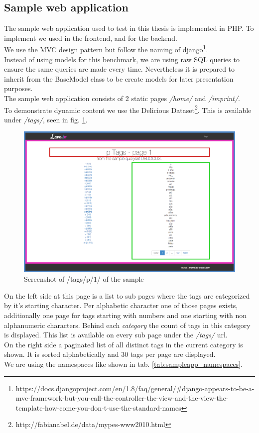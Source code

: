 \subsection{Sample web application}

The sample web application used to test \lare{} in this thesis is implemented in PHP.
To implement \lare{} we used \lareJS{} in the frontend, \twigLare{} and \phpLare{} for the backend.
\\
We use the MVC design pattern but follow the naming of django\footnote{https://docs.djangoproject.com/en/1.8/faq/general/\#django-appears-to-be-a-mvc-framework-but-you-call-the-controller-the-view-and-the-view-the-template-how-come-you-don-t-use-the-standard-names}.
\\
Instead of using models for this benchmark, we are using raw SQL queries to ensure the same queries are made every time.
Nevertheless it is prepared to inherit from the BaseModel class to be create models for later presentation purposes.
\\
The sample web application consists of 2 static pages \emph{/home/} and \emph{/imprint/}.
\\
To demonstrate dynamic content we use the Delicious Dataset\footnote{http://fabianabel.de/data/mypes-www2010.html}.
This is available under \emph{/tags/}, seen in fig. \ref{fig:lare_tags}.
\begin{figure}[H]
\centering 
\includegraphics[width=14cm]{images/lare_p_1.png}
\caption[lare_tags]{Screenshot of /tags/p/1/ of the sample \webApplication{}}
\label{fig:lare_tags}
\end{figure}

\noindent{}On the left side at this page is a list to sub pages where the tags are categorized by it's starting character.
Per alphabetic character one of those pages exists, additionally one page for tags starting with numbers and one starting with non alphanumeric characters.
Behind each \emph{category} the count of tags in this category is displayed.
This list is available on every sub page under the \emph{/tags/} url.
\\
On the right side a paginated list of all distinct tags in the current category is shown.
It is sorted alphabetically and 30 tags per page are displayed.
\\
We are using the namespaces like shown in tab. \ref{tab:sampleapp_namespaces}.

